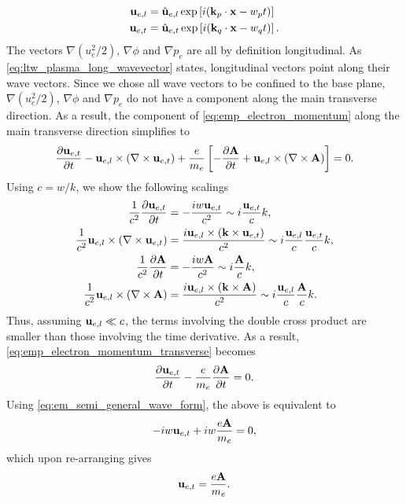 \documentclass[a4paper,11pt]{report}
\begin{document}
\begin{align}
    \mathbf{u}_{e,l} &= \hat{\mathbf{u}}_{e,l} \exp \left [ i (\mathbf{k}_p \cdot \mathbf{x} - w_pt) \right ] \\
    \mathbf{u}_{e,t} &= \hat{\mathbf{u}}_{e,t} \exp \left [ i (\mathbf{k}_q \cdot \mathbf{x} - w_qt) \right ].
\end{align}
The vectors $\nabla \left ( u_e^2 / 2 \right )$, $\nabla \phi$ and $\nabla p_e$ are all by definition longitudinal. As \cref{eq:ltw_plasma_long_wavevector} states, longitudinal vectors point along their wave vectors. Since we chose all wave vectors to be confined to the base plane, $\nabla \left ( u_e^2 / 2 \right )$, $\nabla \phi$ and $\nabla p_e$ do not have a component along the main transverse direction. As a result, the component of \cref{eq:emp_electron_momentum} along the main transverse direction simplifies to
\begin{equation}
    \label{eq:emp_electron_momentum_transverse}
    \frac{\partial\mathbf{u}_{e,t}}{\partial t} - \mathbf{u}_{e,l} \times \left ( \nabla \times \mathbf{u}_{e,t} \right ) + \frac{e}{m_e} \left [ - \frac{\partial \mathbf{A}}{\partial t} + \mathbf{u}_{e,l} \times \left ( \nabla \times \mathbf{A} \right ) \right ] = 0.
\end{equation}
Using $c = w/k$, we show the following scalings 
\begin{align}
    \frac{1}{c^2} \frac{\partial \mathbf{u}_{e,t}}{\partial t} &= -\frac{iw \mathbf{u}_{e,t}}{c^2} \sim i \frac{\mathbf{u}_{e,t}}{c} k , \nonumber \\
    \frac{1}{c^2} \mathbf{u}_{e,l} \times \left (\nabla \times \mathbf{u}_{e,t} \right ) & = \frac{i \mathbf{u}_{e,l} \times \left ( \mathbf{k} \times \mathbf{u}_{e,t} \right ) }{c^2} \sim i \frac{\mathbf{u}_{e,l}}{c} \frac{\mathbf{u}_{e,t}}{c} k , \nonumber \\
    \frac{1}{c^2} \frac{\partial \mathbf{A}}{\partial t} &= -\frac{iw \mathbf{A}}{c^2} \sim i \frac{\mathbf{A}}{c} k , \nonumber \\
    \frac{1}{c^2} \mathbf{u}_{e,l} \times \left ( \nabla \times \mathbf{A} \right ) &= \frac{i \mathbf{u}_{e,l} \times \left ( \mathbf{k} \times \mathbf{A} \right )}{c^2} \sim i \frac{\mathbf{u}_{e,l}}{c} \frac{\mathbf{A}}{c} k .
\end{align}
Thus, assuming $\mathbf{u}_{e,l} \ll c$, the terms involving the double cross product are smaller than those involving the time derivative. As a result, \cref{eq:emp_electron_momentum_transverse} becomes
\begin{equation}
    \frac{\partial\mathbf{u}_{e,t}}{\partial t} - \frac{e}{m_e} \frac{\partial \mathbf{A}}{\partial t} = 0.
\end{equation}
Using \cref{eq:em_semi_general_wave_form}, the above is equivalent to 
\begin{equation}
    -i w \mathbf{u}_{e,t} +i w \frac{e \mathbf{A}}{m_e} = 0,
\end{equation}
which upon re-arranging gives
\begin{equation}
    \label{eq:emp_transverse_velocity}
    \mathbf{u}_{e,t} = \frac{e\mathbf{A}}{m_e}.
\end{equation}
\end{document}
